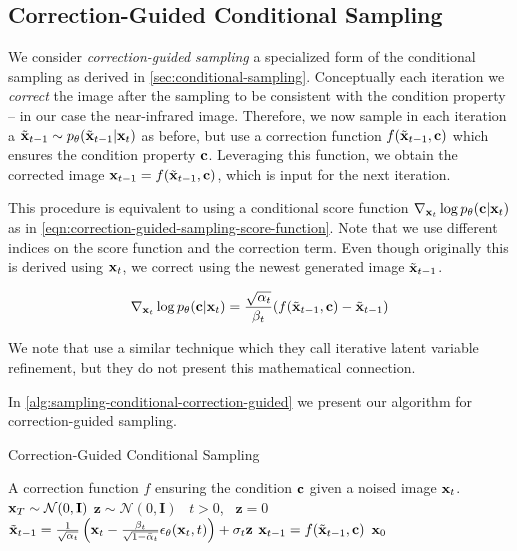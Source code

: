 \subsection{Correction-Guided Conditional Sampling}
\label{sec:correction-guided-sampling}

We consider \textit{correction-guided sampling} a specialized form of the conditional sampling as derived in \autoref{sec:conditional-sampling}.
Conceptually each iteration we \textit{correct} the image after the sampling to be consistent with the condition property -- in our case the near-infrared image.
Therefore, we now sample in each iteration a $\tilde{\mathbf{x}}_{t-1} \sim p_\theta(\tilde{\mathbf{x}}_{t-1}| \mathbf{x}_{t})$ as before, but use a correction function $f(\tilde{\mathbf{x}}_{t-1}, \mathbf{c})$ which ensures the condition property $\mathbf{c}$.
Leveraging this function, we obtain the corrected image $\mathbf{x}_{t-1} = f(\tilde{\mathbf{x}}_{t-1}, \mathbf{c})$, which is input for the next iteration. 

This procedure is equivalent to using a conditional score function $\nabla_{\mathbf{x}_t}\log p_\theta(\mathbf{c} | \mathbf{x}_{t})$ as in \autoref{eqn:correction-guided-sampling-score-function}.
Note that we use different indices on the score function and the correction term. 
Even though originally this is derived using $\mathbf{x}_{t}$, we correct using the newest generated image $\tilde{\mathbf{x}}_{t-1}$.  

\begin{equation}
   \label{eqn:correction-guided-sampling-score-function}
   \nabla_{\mathbf{x}_t}\log p_\theta(\mathbf{c} | \mathbf{x}_{t}) = \frac{\sqrt{\alpha_t}}{\beta_t}(f(\tilde{\mathbf{x}}_{t-1}, \mathbf{c}) - \tilde{\mathbf{x}}_{t-1}) 
\end{equation}

We note that \textcite{ilvr} use a similar technique which they call iterative latent variable refinement, but they do not present this mathematical connection. 

In \autoref{alg:sampling-conditional-correction-guided} we present our algorithm for correction-guided sampling.

\begin{algorithm}[htp!]
   \caption{Correction-Guided Conditional Sampling}
   \label{alg:sampling-conditional-correction-guided}
   \begin{algorithmic}
      \Require A correction function $f$ ensuring the condition $\mathbf{c}$ given a noised image $\mathbf{x}_t$.
      \State $\mathbf{x}_T \sim \mathcal{N}(0, \mathbf{I})$
      \State $\mathbf{z} \sim \mathcal{N}(0, \mathbf{I})$ \algorithmicif\ $t > 0$, \algorithmicelse\ $\mathbf{z} = 0$
      \State $\tilde{\mathbf{x}}_{t-1} = \frac{1}{\sqrt{\alpha_t}} \left(\mathbf{x}_t - \frac{\beta_t}{\sqrt{1 - \bar{\alpha}_t}} \epsilon_\theta(\mathbf{x}_t, t) \right) + \sigma_t \mathbf{z}$
      \State $\mathbf{x}_{t-1} = f(\tilde{\mathbf{x}}_{t-1}, \mathbf{c})$
      \EndFor
      \Return $\mathbf{x}_0$
   \end{algorithmic}
\end{algorithm}

